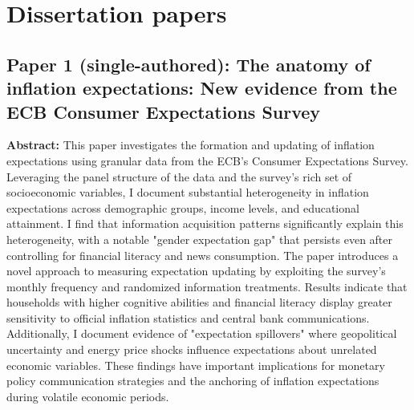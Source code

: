 \documentclass[11pt,a4paper]{article}
\begin{document}
\section*{Dissertation papers}

\subsection*{Paper 1 (single-authored): The anatomy of inflation expectations: New evidence from the ECB Consumer Expectations Survey}
\textbf{Abstract:} This paper investigates the formation and updating of inflation expectations using granular data from the ECB's Consumer Expectations Survey. Leveraging the panel structure of the data and the survey's rich set of socioeconomic variables, I document substantial heterogeneity in inflation expectations across demographic groups, income levels, and educational attainment. I find that information acquisition patterns significantly explain this heterogeneity, with a notable "gender expectation gap" that persists even after controlling for financial literacy and news consumption. The paper introduces a novel approach to measuring expectation updating by exploiting the survey's monthly frequency and randomized information treatments. Results indicate that households with higher cognitive abilities and financial literacy display greater sensitivity to official inflation statistics and central bank communications. Additionally, I document evidence of "expectation spillovers" where geopolitical uncertainty and energy price shocks influence expectations about unrelated economic variables. These findings have important implications for monetary policy communication strategies and the anchoring of inflation expectations during volatile economic periods.
\end{document}
